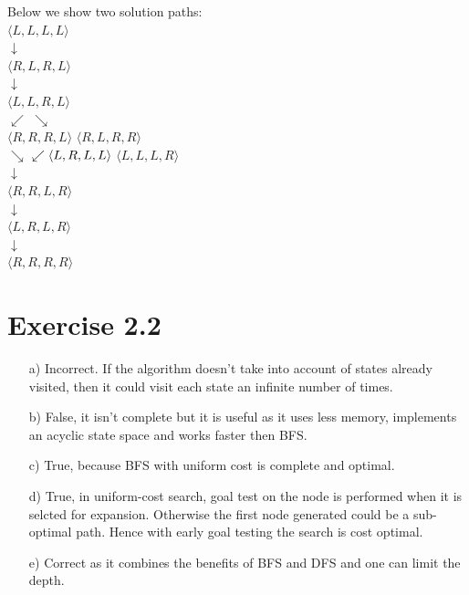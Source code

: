 \documentclass[12pt]{article}
\begin{document}
Below we show two solution paths:\\
\hspace*{24mm}
$\langle L,L,L,L \rangle$ \\ \hspace*{35mm}%
$ \downarrow$ \\ \hspace*{25mm}%
$\langle R,L,R,L \rangle$ \\ \hspace*{35mm}%
$\downarrow$ \\ \hspace*{25mm}%
$\langle L,L,R,L \rangle$ \\ \hspace*{10mm}%
$\swarrow$ \hspace*{40mm}%
$\searrow$ \\
$\langle R,R,R,L \rangle$ \hspace*{25mm}%
$\langle R,L,R,R \rangle$ \\ \hspace*{10mm}%
$\searrow$ \hspace*{40mm}%
$\swarrow \\ \langle L,R,L,L \rangle$ \hspace*{25mm}%
$\langle L,L,L,R \rangle$ \\ \hspace*{35mm}%
$\downarrow$ \\ \hspace*{25mm}%
$\langle R,R,L,R \rangle$ \\ \hspace*{35mm}%
$\downarrow$ \\ \hspace*{25mm}%
$\langle L,R,L,R \rangle$ \\ \hspace*{35mm}%
$\downarrow$ \\ \hspace*{25mm}%
$\langle R,R,R,R \rangle$ \newpage


\section*{Exercise 2.2}

\begin{enumerate}
    \item[a)] Incorrect. If the algorithm doesn't take into account of states already visited, then it could visit each state an infinite number of times. 
    \item[b)] False, it isn't complete but it is useful as it uses less memory, implements an acyclic state space and works faster then BFS.  
    \item[c)] True, because BFS with uniform cost is complete and optimal.
    \item[d)] True, in uniform-cost search, goal test on the node is performed when it is selcted for expansion. Otherwise the first node generated could be a sub-optimal path. Hence with early goal testing the search is cost optimal.
    \item[e)] Correct as it combines the benefits of BFS and DFS and one can limit the depth.\newline
\end{enumerate}
\end{document}
